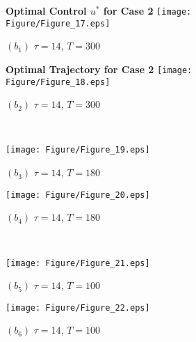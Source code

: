 \documentclass[10pt,letterpaper]{article}
\begin{document}
\begin{figure}[H]
    \centering
    \begin{subfigure}[t]{0.48\textwidth}
        \centering
        \textbf{Optimal Control $u^*$ for Case 2}
        \texttt{[image: Figure/Figure\_17.eps]}
        \par \vspace{1pt} $(b_1)$ $\tau = 14$, $T = 300$
    \end{subfigure}
    \hfill
    \begin{subfigure}[t]{0.48\textwidth}
        \centering
        \textbf{Optimal Trajectory for Case 2}
        \texttt{[image: Figure/Figure\_18.eps]}
        \par \vspace{1pt} $(b_2)$ $\tau = 14$, $T = 300$
    \end{subfigure}
    \\[10pt] %
    
    \begin{subfigure}[t]{0.48\textwidth}
        \centering
        \texttt{[image: Figure/Figure\_19.eps]}
        \par \vspace{1pt} $(b_3)$ $\tau = 14$, $T = 180$
    \end{subfigure}
    \hfill
    \begin{subfigure}[t]{0.48\textwidth}
        \centering
        \texttt{[image: Figure/Figure\_20.eps]}
        \par \vspace{1pt} $(b_4)$ $\tau = 14$, $T = 180$
    \end{subfigure}
    \\[10pt]
    
    \begin{subfigure}[t]{0.48\textwidth}
        \centering
        \texttt{[image: Figure/Figure\_21.eps]}
        \par \vspace{1pt} $(b_5)$ $\tau = 14$, $T = 100$
    \end{subfigure}
    \hfill
    \begin{subfigure}[t]{0.48\textwidth}
        \centering
        \texttt{[image: Figure/Figure\_22.eps]}
        \par \vspace{1pt} $(b_6)$ $\tau = 14$, $T = 100$
    \end{subfigure}
    \\[10pt]
    

\end{figure}
\end{document}
